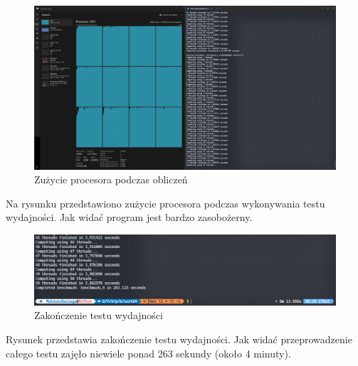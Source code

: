 \newpage

\begin{figure}[!htb]
  \begin{center}
    \includegraphics[width=\textwidth]{rys/computing_in_progress.png}
    \caption{Zużycie procesora podczas obliczeń}
    \label{rys:computing_in_progress}
  \end{center}
\end{figure}

Na rysunku  przedstawiono zużycie procesora podczas wykonywania testu wydajności.
Jak widać program jest bardzo zasobożerny.

\begin{figure}[!htb]
  \begin{center}
    \includegraphics[width=\textwidth]{rys/computing_done.png}
    \caption{Zakończenie testu wydajności}
    \label{rys:computing_done}
  \end{center}
\end{figure}

Rysunek  przedstawia zakończenie testu wydajności.
Jak widać przeprowadzenie całego testu zajęło niewiele ponad 263 sekundy (około 4 minuty).

\newpage

